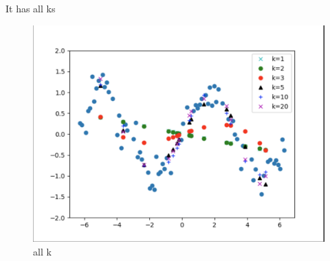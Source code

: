 \begin{answer}
It has all ks
\begin{figure}
    \centering
    \includegraphics[width=0.5\linewidth]{Screenshot 2024-01-16 at 22.32.55.png}
    \caption{all k}
    \label{fig:enter-label}
\end{figure}
\end{answer}

